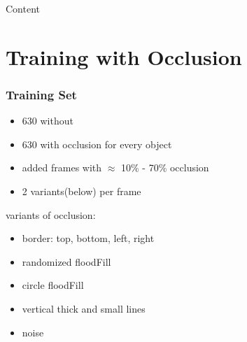 \documentclass[xcolor=dvipsnames]{beamer}
\begin{document}
\begin{frame}{Content}
	\large
	\tableofcontents[subsubsectionstyle=hide]
\end{frame}

\section{Training with Occlusion}
\begin{frame}
	\frametitle{Training Set}
	\Large
	\begin{itemize}
		\item 630 without
		\item 630 with occlusion for every object
		\item added frames with $\approx$ 10\% - 70\% occlusion
		\item 2 variants(below) per frame 
	\end{itemize}
	\vspace{0.3cm}
	variants of occlusion:
	\begin{itemize}
		\item border: top, bottom, left, right
		\item randomized floodFill
		\item circle floodFill
		\item vertical thick and small lines
		\item noise
	\end{itemize}
\end{frame}
\end{document}
